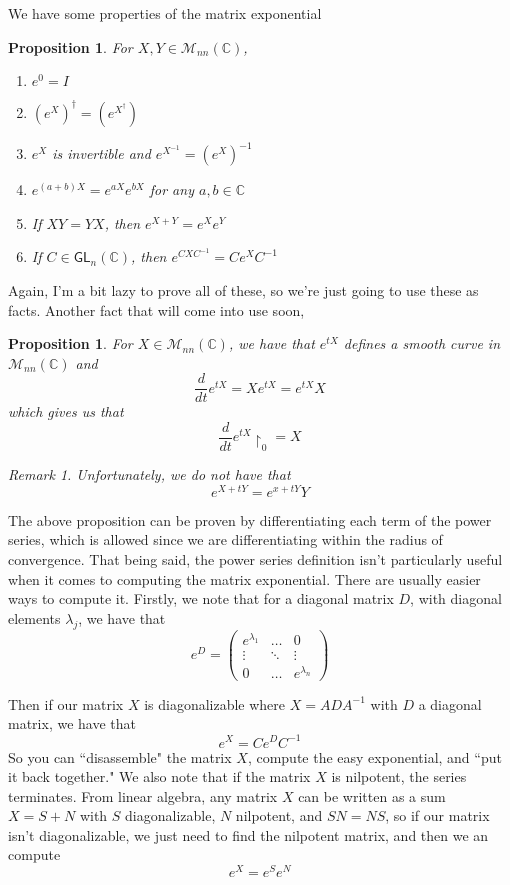 \documentclass[psamsfonts]{amsart}
\newtheorem{prop}[thm]{Proposition}
\theoremstyle{definition}
\theoremstyle{remark}
\newtheorem*{rem*}{Remark}
\newcommand{\C}{\mathbb{C}}
\newcommand{\M}{\mathcal{M}}
\newcommand{\GL}{\mathsf{GL}}
\newcommand{\inv}{^{-1}}
\begin{document}
We have some properties of the matrix exponential
\begin{prop}
For $X,Y \in \mathcal{M}_{nn}(\C)$,
\begin{enumerate}
\item $e^0 = I$ 
\item $\left( e^X \right)^\dagger = \left( e^{X ^\dagger} \right)$
\item $e^X$ is invertible and $e^{X\inv} = \left( e^{X} \right)\inv$
\item $e^{(a + b)X} = e^{aX}e^{bX}$ for any $a, b \in \C$
\item If $XY = YX$, then $e^{X + Y} = e^Xe^Y$
\item If $C \in \GL_n(\C)$, then $e^{CXC\inv} = Ce^XC\inv$
\end{enumerate}
\end{prop}

Again, I'm a bit lazy to prove all of these, so we're just going to use these as facts. Another fact that will come into use soon,

\begin{prop}
For $X \in \M_{nn}(\C)$, we have that $e^{tX}$ defines a smooth curve in $\M_{nn}(\C)$ and
$$\frac{d}{dt}e^{tX} = Xe^{tX} = e^{tX}X $$
which gives us that
$$\frac{d}{dt}e^{tX}\restriction_0 = X $$
\begin{rem*}
Unfortunately, we do not have that 
$$e^{X + tY} = e^{x+tY}Y $$
\end{rem*}
\end{prop}

The above proposition can be proven by differentiating each term of the power series, which is allowed since we are differentiating within the radius of convergence. That being said, the power series definition isn't particularly useful when it comes to computing the matrix exponential. There are usually easier ways to compute it. Firstly, we note that for a diagonal matrix $D$, with diagonal elements $\lambda_j$, we have that
$$e^D = \begin{pmatrix}
e^{\lambda_1} & \ldots & 0 \\
\vdots & \ddots & \vdots \\
0 & \ldots & e^{\lambda_n}
\end{pmatrix} $$

Then if our matrix $X$ is diagonalizable where $X = ADA\inv$ with $D$ a diagonal matrix, we have that 
$$e^X = C e^D C\inv $$
So you can ``disassemble" the matrix $X$, compute the easy exponential, and ``put it back together." We also note that if the matrix $X$ is nilpotent, the series terminates. From linear algebra, any matrix $X$ can be written as a sum $X = S + N$ with $S$ diagonalizable, $N$ nilpotent, and $SN = NS$, so if our matrix isn't diagonalizable, we just need to find the nilpotent matrix, and then we an compute
$$e^X = e^Se^N $$
\end{document}
